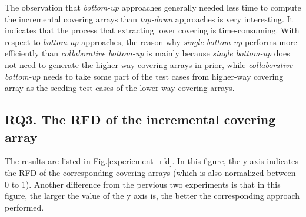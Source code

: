 \documentclass[conference]{IEEEtran}
\theoremstyle{definition}
\begin{document}
The observation that \emph{bottom-up} approaches generally needed less time to compute the incremental covering arrays than \emph{top-down} approaches is very interesting. It indicates that the process that extracting lower covering is time-consuming. %
With respect to \emph{bottom-up} approaches,  the reason why \emph{single bottom-up} performs more efficiently than \emph{collaborative bottom-up} is mainly because  \emph{single bottom-up} does not need to generate the higher-way covering arrays in prior, while \emph{collaborative bottom-up}  needs to take some part of the test cases from higher-way covering array as the seeding test cases of the lower-way covering arrays.


\subsection{RQ3. The RFD of the incremental covering array}

The results are listed in Fig.\ref{experiement_rfd}. In this figure, the y axis indicates the RFD of the corresponding covering arrays (which is also normalized between 0 to 1). Another difference from the pervious two experiments is that in this figure, the larger the value of the y axis is, the better the corresponding approach performed.
\end{document}
